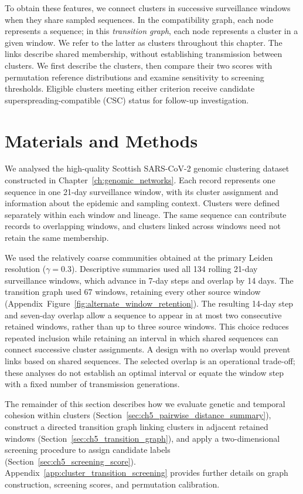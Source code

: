 To obtain these features, we connect clusters in successive surveillance windows when they share sampled sequences. In the compatibility graph, each node represents a sequence; in this \emph{transition graph}, each node represents a cluster in a given window. We refer to the latter as clusters throughout this chapter. The links describe shared membership, without establishing transmission between clusters. We first describe the clusters, then compare their two scores with permutation reference distributions and examine sensitivity to screening thresholds. Eligible clusters meeting either criterion receive candidate superspreading-compatible (CSC) status for follow-up investigation.

\section{Materials and Methods}\label{sec:ch5_methods}

We analysed the high-quality Scottish SARS-CoV-2 genomic clustering dataset constructed in Chapter~\ref{ch:genomic_networks}. Each record represents one sequence in one 21-day surveillance window, with its cluster assignment and information about the epidemic and sampling context. Clusters were defined separately within each window and lineage. The same sequence can contribute records to overlapping windows, and clusters linked across windows need not retain the same membership.

We used the relatively coarse communities obtained at the primary Leiden resolution ($\gamma = 0.3$). Descriptive summaries used all 134 rolling 21-day surveillance windows, which advance in 7-day steps and overlap by 14 days. The transition graph used 67 windows, retaining every other source window (Appendix~Figure~\ref{fig:alternate_window_retention}). The resulting 14-day step and seven-day overlap allow a sequence to appear in at most two consecutive retained windows, rather than up to three source windows. This choice reduces repeated inclusion while retaining an interval in which shared sequences can connect successive cluster assignments. A design with no overlap would prevent links based on shared sequences. The selected overlap is an operational trade-off; these analyses do not establish an optimal interval or equate the window step with a fixed number of transmission generations.

The remainder of this section describes how we evaluate genetic and temporal cohesion within clusters (Section~\ref{sec:ch5_pairwise_distance_summary}), construct a directed transition graph linking clusters in adjacent retained windows (Section~\ref{sec:ch5_transition_graph}), and apply a two-dimensional screening procedure to assign candidate labels (Section~\ref{sec:ch5_screening_score}). Appendix~\ref{app:cluster_transition_screening} provides further details on graph construction, screening scores, and permutation calibration.

